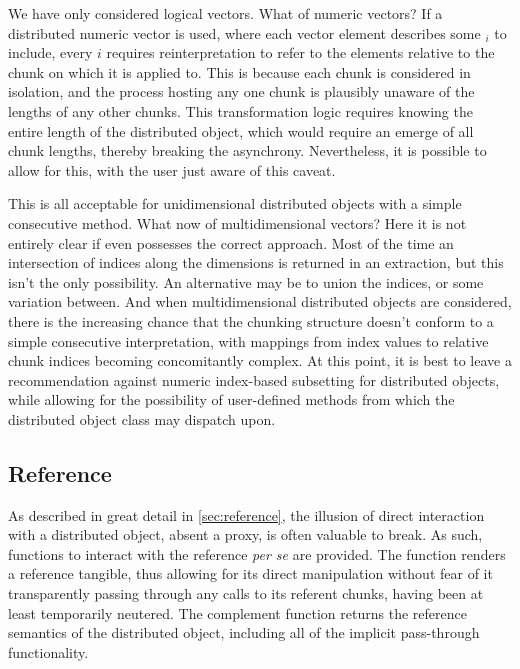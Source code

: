 We have only considered logical vectors.
What of numeric vectors?
If a distributed numeric vector is used, where each vector element describes some $_i$ to include, every $i$ requires reinterpretation to refer to the elements relative to the chunk on which it is applied to.
This is because each chunk is considered in isolation, and the process hosting any one chunk is plausibly unaware of the lengths of any other chunks.
This transformation logic requires knowing the entire length of the distributed object, which would require an emerge of all chunk lengths, thereby breaking the asynchrony.
Nevertheless, it is possible to allow for this, with the user just aware of this caveat.

This is all acceptable for unidimensional distributed objects with a simple consecutive  method.
What now of multidimensional vectors?
Here it is not entirely clear if \R{} even possesses the correct approach.
Most of the time an intersection of indices along the dimensions is returned in an extraction, but this isn't the only possibility.
An alternative may be to union the indices, or some variation between.
And when multidimensional distributed objects are considered, there is the increasing chance that the chunking structure doesn't conform to a simple consecutive interpretation, with mappings from index values to relative chunk indices becoming concomitantly complex.
At this point, it is best to leave a recommendation against numeric index-based subsetting for distributed objects, while allowing for the possibility of user-defined methods from which the distributed object class may dispatch upon.

\subsection{Reference}

As described in great detail in \cref{sec:reference}, the illusion of direct interaction with a distributed object, absent a proxy, is often valuable to break.
As such, functions to interact with the reference \textit{per se} are provided.
The  function renders a reference tangible, thus allowing for its direct manipulation without fear of it transparently passing through any calls to its referent chunks, having been at least temporarily neutered.
The complement function  returns the reference semantics of the distributed object, including all of the implicit pass-through functionality.

